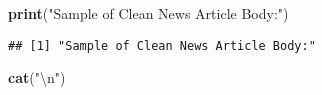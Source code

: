 \documentclass[]{article}
\newenvironment{Shaded}{\begin{snugshade}}{\end{snugshade}}
\newcommand{\KeywordTok}[1]{\textcolor[rgb]{0.13,0.29,0.53}{\textbf{#1}}}
\newcommand{\DecValTok}[1]{\textcolor[rgb]{0.00,0.00,0.81}{#1}}
\newcommand{\CharTok}[1]{\textcolor[rgb]{0.31,0.60,0.02}{#1}}
\newcommand{\StringTok}[1]{\textcolor[rgb]{0.31,0.60,0.02}{#1}}
\newcommand{\OperatorTok}[1]{\textcolor[rgb]{0.81,0.36,0.00}{\textbf{#1}}}
\newcommand{\NormalTok}[1]{#1}
\begin{document}
\begin{Shaded}
\begin{Highlighting}[]
\KeywordTok{print}\NormalTok{(}\StringTok{"Sample of Clean News Article Body:"}\NormalTok{)}
\end{Highlighting}
\end{Shaded}

\begin{verbatim}
## [1] "Sample of Clean News Article Body:"
\end{verbatim}

\begin{Shaded}
\begin{Highlighting}[]
\KeywordTok{cat}\NormalTok{(}\StringTok{"}\CharTok{\textbackslash{}n}\StringTok{"}\NormalTok{)}
\end{Highlighting}
\end{Shaded}

\begin{Shaded}
\end{Shaded}
\end{document}
